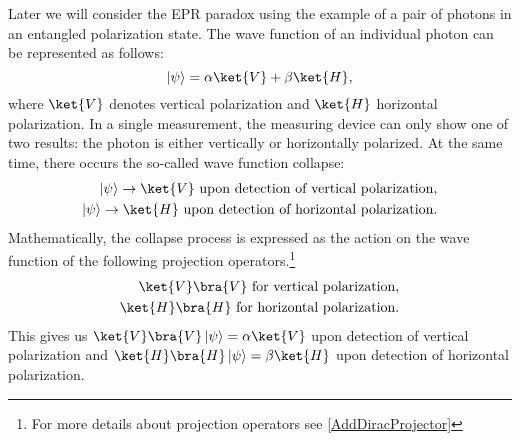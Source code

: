 Later we will consider the EPR paradox using the example of a pair of photons in an entangled 
polarization state. The wave function of an individual photon can be 
represented as follows:
\begin{equation}
\left|\psi\right> = \alpha \ket{V} +
\beta \ket{H}, 
\label{eqEntaglementPSI}
\end{equation}
where $\ket{V}$ denotes vertical polarization and 
$\ket{H}$ horizontal polarization. In a single
measurement, the measuring device can only show one of two 
results: the photon is either vertically or horizontally polarized. At the same time,
there occurs the so-called wave function collapse:
\begin{eqnarray}
\left|\psi\right> \rightarrow \ket{V} \mbox{ upon detection of vertical polarization},
\nonumber \\
\left|\psi\right> \rightarrow \ket{H} \mbox{ upon detection of horizontal polarization}.
\nonumber
\end{eqnarray}
Mathematically, the collapse process is expressed as the action on the wave function of the following 
projection operators.\footnote{For more details about projection
  operators see \autoref{AddDiracProjector}}
\begin{eqnarray}
\ket{V}\bra{V} \mbox{ for vertical polarization},
\nonumber \\
 \ket{H}\bra{H} \mbox{ for horizontal polarization}.
\label{eqEntaglementProjector}
\end{eqnarray}
This gives us $\ket{V}\bra{V}\left|\psi\right> = \alpha \ket{V}$ 
upon detection of vertical polarization and
$\ket{H}\bra{H}\left|\psi\right> = \beta \ket{H}$ 
upon detection of horizontal polarization.

